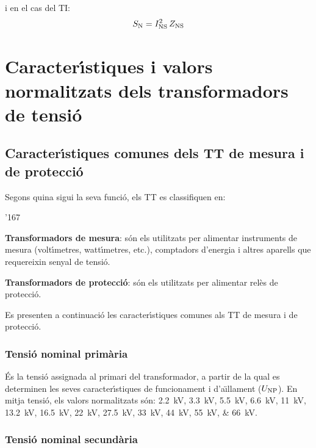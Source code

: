 i en el cas del TI:
\begin{equation}\label{eq:sn_ti}
    S_\mathrm{N} = I_\mathrm{NS}^2 \,Z_\mathrm{NS}
\end{equation}


\section{Caracter\'{\i}stiques i valors normalitzats dels transformadors de tensi\'{o}}

\subsection{Caracter\'{\i}stiques comunes dels TT de mesura i de protecci\'{o}}

Segons quina sigui la seva funci\'{o}, els TT es classifiquen en:
\begin{dinglist}{'167}
   \item \textbf{Transformadors de mesura}: s\'{o}n els utilitzats per alimentar
            instruments de mesura (volt\'{\i}metres, watt\'{\i}metres, etc.),
            comptadors d'energia i altres aparells que requereixin senyal de tensi\'{o}.
   \item \textbf{Transformadors de protecci\'{o}}: s\'{o}n els utilitzats per
   alimentar rel\`{e}s de protecci\'{o}.
\end{dinglist}

Es presenten a continuaci\'{o} les caracter\'{\i}stiques comunes als TT de
mesura i de protecci\'{o}.

\subsubsection{Tensi\'{o} nominal prim\`{a}ria}

\'{E}s la tensi\'{o} assignada al primari del transformador, a partir de la
qual es determinen les seves caracter\'{\i}stiques de funcionament i
d'a\"{\i}llament ($U_\mathrm{NP}$). En mitja tensi\'{o}, els valors normalitzats
s\'{o}n: \SIlist{2,2; 3,3; 5,5; 6,6; 11; 13,2; 16,5; 22; 27,5; 33; 44; 55; 66}{kV}.

\subsubsection{Tensi\'{o} nominal secund\`{a}ria}


